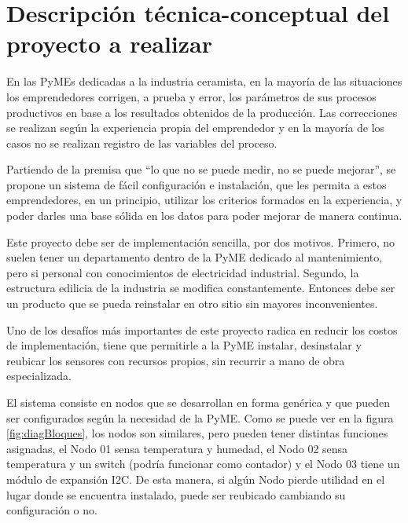 \documentclass[11pt]{charter}
\begin{document}
\section{Descripción técnica-conceptual del proyecto a realizar}
\label{sec:descripcion}


En las PyMEs dedicadas a la industria ceramista, en la mayoría de las situaciones los emprendedores corrigen, a prueba y error, los parámetros de sus procesos productivos en base a los resultados obtenidos de la producción. Las correcciones se realizan según la experiencia propia del emprendedor y en la mayoría de los casos no se realizan registro de las variables del proceso.

Partiendo de la premisa que “lo que no se puede medir, no se puede mejorar”, se propone un sistema de fácil configuración e instalación, que les permita a estos emprendedores, en un principio, utilizar los criterios formados en la experiencia, y poder darles una base sólida en los datos para poder mejorar de manera continua.

Este proyecto debe ser de implementación sencilla, por dos motivos. Primero, no suelen tener un departamento dentro de la PyME dedicado al mantenimiento, pero si personal con conocimientos de electricidad industrial. Segundo, la estructura edilicia de la industria se modifica constantemente. Entonces debe ser un producto que se pueda reinstalar en otro sitio sin mayores inconvenientes.

Uno de los desafíos más importantes de este proyecto radica en reducir los costos de implementación, tiene que permitirle a la PyME instalar, desinstalar y reubicar los sensores con recursos propios, sin recurrir a mano de obra especializada.

El sistema consiste en nodos que se desarrollan en forma genérica y que pueden ser configurados según la necesidad de la PyME. Como se puede ver en la figura \ref{fig:diagBloques}, los nodos son similares, pero pueden tener distintas funciones asignadas, el Nodo 01 sensa temperatura y humedad, el Nodo 02 sensa temperatura y un switch (podría funcionar como contador) y el Nodo 03 tiene un módulo de expansión I2C. De esta manera, si algún Nodo pierde utilidad en el lugar donde se encuentra instalado, puede ser reubicado cambiando su configuración o no.


\vspace{10px}
\end{document}
